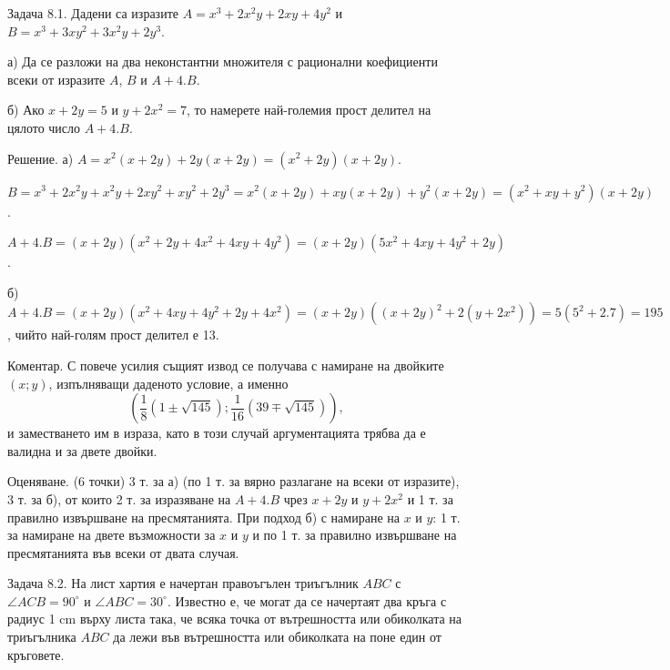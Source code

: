 
Задача 8.1. Дадени са изразите $A=x^3+2x^2y+2xy+4y^2$ и $B=x^3+3xy^2+3x^2y+2y^3$.

а) Да се разложи на два неконстантни множителя с рационални коефициенти всеки от изразите $A$, $B$ и $A+4.B$.

б) Ако $x+2y=5$ и $y+2x^2=7$, то намерете най-големия прост делител на цялото число $A+4.B$.

Решение. а) $A=x^2(x+2y)+2y(x+2y)=(x^2+2y)(x+2y)$.

$B=x^3+2x^2y+x^2y+2xy^2+xy^2+2y^3=x^2(x+2y)+xy(x+2y)+y^2(x+2y)=(x^2+xy+y^2)(x+2y)$.

$A+4.B=(x+2y)(x^2+2y+4x^2+4xy+4y^2)=(x+2y)(5x^2+4xy+4y^2+2y)$.

б) $A+4.B=(x+2y)(x^2+4xy+4y^2+2y+4x^2)=(x+2y)((x+2y)^2+2(y+2x^2))=5(5^2+2.7)=195$, чийто най-голям прост делител е 13.

Коментар. С повече усилия същият извод се получава с намиране на двойките $(x;y)$, изпълняващи даденото условие, а именно
$$
\left(\frac18(1\pm\sqrt{145});\frac1{16}(39\mp\sqrt{145})\right),
$$
и заместването им в израза, като в този случай аргументацията трябва да е валидна и за двете двойки.

Оценяване. (6 точки) 3 т. за а) (по 1 т. за вярно разлагане на всеки от изразите), 3 т. за б), от които 2 т. за изразяване на $A+4.B$ чрез $x+2y$ и $y+2x^2$ и 1 т. за правилно извършване на пресмятанията. При подход б) с намиране на $x$ и $y$: 1 т. за намиране на двете възможности за $x$ и $y$ и по 1 т. за правилно извършване на пресмятанията във всеки от двата случая.

Задача 8.2. На лист хартия е начертан правоъгълен триъгълник $ABC$ с $\angle ACB=90^\circ$ и $\angle ABC=30^\circ$. Известно е, че могат да се начертаят два кръга с радиус 1 cm върху листа така, че всяка точка от вътрешността или обиколката на триъгълника $ABC$ да лежи във вътрешността или обиколката на поне един от кръговете.

